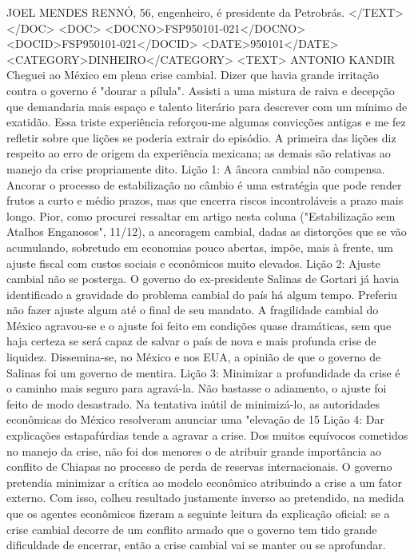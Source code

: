 JOEL MENDES RENNÓ, 56, engenheiro, é presidente da Petrobrás.
</TEXT>
</DOC>
<DOC>
<DOCNO>FSP950101-021</DOCNO>
<DOCID>FSP950101-021</DOCID>
<DATE>950101</DATE>
<CATEGORY>DINHEIRO</CATEGORY>
<TEXT>
ANTONIO KANDIR 
Cheguei ao México em plena crise cambial. Dizer que havia grande irritação contra o governo é "dourar a pílula". Assisti a uma mistura de raiva e decepção que demandaria mais espaço e talento literário para descrever com um mínimo de exatidão. Essa triste experiência reforçou-me algumas convicções antigas e me fez refletir sobre que lições se poderia extrair do episódio. A primeira das lições diz respeito ao erro de origem da experiência mexicana; as demais são relativas ao manejo da crise propriamente dito.
Lição 1: A âncora cambial não compensa. Ancorar o processo de estabilização no câmbio é uma estratégia que pode render frutos a curto e médio prazos, mas que encerra riscos incontroláveis a prazo mais longo. Pior, como procurei ressaltar em artigo nesta coluna ("Estabilização sem Atalhos Enganosos", 11/12), a ancoragem cambial, dadas as distorções que se vão acumulando, sobretudo em economias pouco abertas, impõe, mais à frente, um ajuste fiscal com custos sociais e econômicos muito elevados.
Lição 2: Ajuste cambial não se posterga. O governo do ex-presidente Salinas de Gortari já havia identificado a gravidade do problema cambial do país há algum tempo. Preferiu não fazer ajuste algum até o final de seu mandato. A fragilidade cambial do México agravou-se e o ajuste foi feito em condições quase dramáticas, sem que haja certeza se será capaz de salvar o país de nova e mais profunda crise de liquidez. Dissemina-se, no México e nos EUA, a opinião de que o governo de Salinas foi um governo de mentira.
Lição 3: Minimizar a profundidade da crise é o caminho mais seguro para agravá-la. Não bastasse o adiamento, o ajuste foi feito de modo desastrado. Na tentativa inútil de minimizá-lo, as autoridades econômicas do México resolveram anunciar uma "elevação de 15%
Lição 4: Dar explicações estapafúrdias tende a agravar a crise. Dos muitos equívocos cometidos no manejo da crise, não foi dos menores o de atribuir grande importância ao conflito de Chiapas no processo de perda de reservas internacionais. O governo pretendia minimizar a crítica ao modelo econômico atribuindo a crise a um fator externo. Com isso, colheu resultado justamente inverso ao pretendido, na medida que os agentes econômicos fizeram a seguinte leitura da explicação oficial: se a crise cambial decorre de um conflito armado que o governo tem tido grande dificuldade de encerrar, então a crise cambial vai se manter ou se aprofundar.
